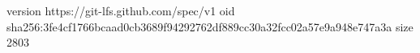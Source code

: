 version https://git-lfs.github.com/spec/v1
oid sha256:3fe4cf1766bcaad0cb3689f94292762df889cc30a32fcc02a57e9a948e747a3a
size 2803
